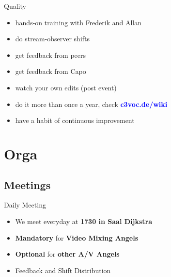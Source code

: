 \documentclass[hyperref={pdfpagelabels=false},aspectratio=169]{beamer}
\begin{document}
\begin{frame}{Quality}
\begin{itemize} %
\item hands-on training with Frederik and Allan %
\item do stream-observer shifts %
\item get feedback from peers %
\item get feedback from Capo %
\item watch your own edits (post event) %
\item do it more than once a year, check 
\textcolor{blue}{\textbf{c3voc.de/wiki }} %
\item have a habit of continuous improvement %
\end{itemize} 
\end{frame}

\section{Orga} 
\subsection{Meetings}
\begin{frame}{Daily Meeting}
\begin{itemize}
\item  We meet everyday at \textbf{1730 in Saal Dijkstra}
\item  \textbf{Mandatory} for \textbf{Video Mixing Angels}
\item  \textbf{Optional} for \textbf{other A/V Angels}
\item  Feedback and Shift Distribution
\end{itemize} 
\end{frame}
\end{document}
